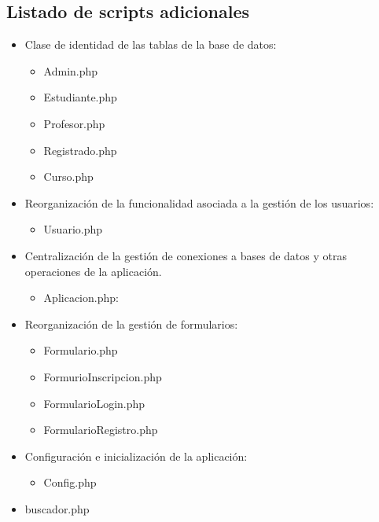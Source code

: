 \documentclass[
]{article}
\providecommand{\tightlist}{%
  \setlength{\itemsep}{0pt}\setlength{\parskip}{0pt}}
\begin{document}
\vspace{12mm}

\subsection{Listado de scripts
adicionales}\label{listado-de-scripts-adicionales}

\begin{itemize}
\item
  Clase de identidad de las tablas de la base de datos:

  \begin{itemize}
  \item
    Admin.php
  \item
    Estudiante.php
  \item
    Profesor.php
  \item
    Registrado.php
  \item
    Curso.php
  \end{itemize}
\item
  Reorganización de la funcionalidad asociada a la gestión de los
  usuarios:

  \begin{itemize}
  \tightlist
  \item
    Usuario.php
  \end{itemize}
\item
  Centralización de la gestión de conexiones a bases de datos y otras
  operaciones de la aplicación.

  \begin{itemize}
  \tightlist
  \item
    Aplicacion.php:
  \end{itemize}
\item
  Reorganización de la gestión de formularios:

  \begin{itemize}
  \item
    Formulario.php
  \item
    FormurioInscripcion.php
  \item
    FormularioLogin.php
  \item
    FormularioRegistro.php
  \end{itemize}
\item
  Configuración e inicialización de la aplicación:

  \begin{itemize}
  \tightlist
  \item
    Config.php
  \end{itemize}
\item
  buscador.php
\end{itemize}
\end{document}
